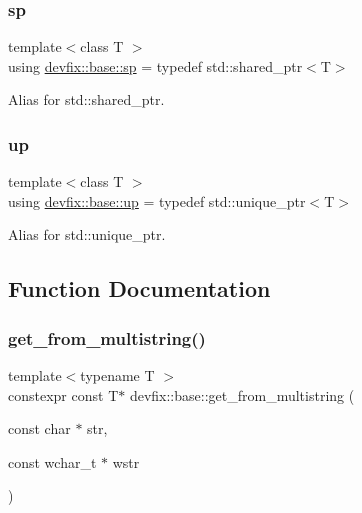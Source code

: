 \subsubsection{\texorpdfstring{sp}{sp}}
{\footnotesize\ttfamily template$<$class T $>$ \\
using \hyperlink{namespacedevfix_1_1base_ad239a07977b9e77ffabaf558636d0b8b}{devfix\+::base\+::sp} = typedef std\+::shared\+\_\+ptr$<$T$>$}



Alias for std\+::shared\+\_\+ptr. 

\mbox{\label{namespacedevfix_1_1base_a18dfbd492717795cee1cfa6f14a8f724}} 
\subsubsection{\texorpdfstring{up}{up}}
{\footnotesize\ttfamily template$<$class T $>$ \\
using \hyperlink{namespacedevfix_1_1base_a18dfbd492717795cee1cfa6f14a8f724}{devfix\+::base\+::up} = typedef std\+::unique\+\_\+ptr$<$T$>$}



Alias for std\+::unique\+\_\+ptr. 



\subsection{Function Documentation}
\mbox{\label{namespacedevfix_1_1base_a84282bc5458412dfed5ce8b039a70519}} 
\subsubsection{\texorpdfstring{get\+\_\+from\+\_\+multistring()}{get\_from\_multistring()}}
{\footnotesize\ttfamily template$<$typename T $>$ \\
constexpr const T$\ast$ devfix\+::base\+::get\+\_\+from\+\_\+multistring (\begin{DoxyParamCaption}\item[{const char $\ast$}]{str,  }\item[{const wchar\+\_\+t $\ast$}]{wstr }\end{DoxyParamCaption})}

